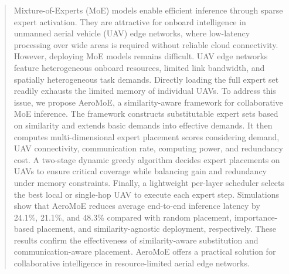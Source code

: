 \documentclass[journal]{IEEEtran}
\begin{document}
\begin{CJK*}{UTF8}{gbsn}
\begin{abstract}
Mixture-of-Experts (MoE) models enable efficient inference through sparse expert activation. They are attractive for onboard intelligence in unmanned aerial vehicle (UAV) edge networks, where low-latency processing over wide areas is required without reliable cloud connectivity. However, deploying MoE models remains difficult. UAV edge networks feature heterogeneous onboard resources, limited link bandwidth, and spatially heterogeneous task demands. Directly loading the full expert set readily exhausts the limited memory of individual UAVs.
To address this issue, we propose AeroMoE, a similarity-aware framework for collaborative MoE inference. The framework constructs substitutable expert sets based on similarity and extends basic demands into effective demands. It then computes multi-dimensional expert placement scores considering demand, UAV connectivity, communication rate, computing power, and redundancy cost. A two-stage dynamic greedy algorithm decides expert placements on UAVs to ensure critical coverage while balancing gain and redundancy under memory constraints. Finally, a lightweight per-layer scheduler selects the best local or single-hop UAV to execute each {\color{black}expert step}. %
Simulations show that AeroMoE reduces average end-to-end inference latency by 24.1\%, 21.1\%, and 48.3\% %
compared with random placement, importance-based placement, and similarity-agnostic deployment, respectively. These results confirm the effectiveness of similarity-aware substitution and communication-aware placement. AeroMoE offers a practical solution for collaborative intelligence in resource-limited aerial edge networks.
\end{abstract}


\end{CJK*}
\end{document}

